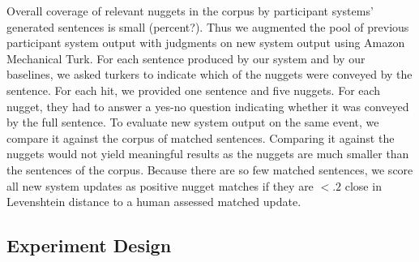 Overall coverage of
relevant nuggets in the corpus  by participant systems' generated sentences
is small (percent?). Thus we augmented the pool of previous participant system
output with judgments on new system output using Amazon Mechanical Turk. For
each sentence produced by our system and by our baselines, we asked turkers to
indicate which of the nuggets were conveyed by the sentence. For each hit, we
provided one sentence and five nuggets. For each nugget, they had to answer a
yes-no question indicating whether it was conveyed by the full sentence.
To evaluate new system output on the same event, we compare it against the
corpus of matched sentences. Comparing it against the nuggets would not yield
meaningful results as the nuggets are much smaller than the sentences of the
corpus.
Because there are so few matched sentences, we score all new system updates as positive
nugget matches if they are $< .2$ close in Levenshtein distance to a human
assessed matched update. 

\subsection{Experiment Design}


